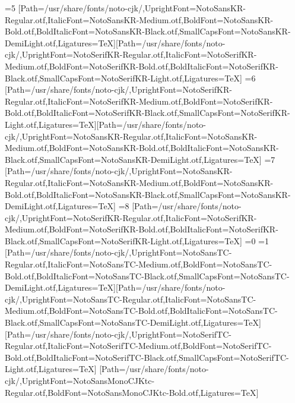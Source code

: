 \else\ifnum\value{CJKFonts}=5
[Path=/usr/share/fonts/noto-cjk/,UprightFont=NotoSansKR-Regular.otf,ItalicFont=NotoSansKR-Medium.otf,BoldFont=NotoSansKR-Bold.otf,BoldItalicFont=NotoSansKR-Black.otf,SmallCapsFont=NotoSansKR-DemiLight.otf,Ligatures=TeX][Path=/usr/share/fonts/noto-cjk/,UprightFont=NotoSerifKR-Regular.otf,ItalicFont=NotoSerifKR-Medium.otf,BoldFont=NotoSerifKR-Bold.otf,BoldItalicFont=NotoSerifKR-Black.otf,SmallCapsFont=NotoSerifKR-Light.otf,Ligatures=TeX]
\else\ifnum\value{CJKFonts}=6
[Path=/usr/share/fonts/noto-cjk/,UprightFont=NotoSerifKR-Regular.otf,ItalicFont=NotoSerifKR-Medium.otf,BoldFont=NotoSerifKR-Bold.otf,BoldItalicFont=NotoSerifKR-Black.otf,SmallCapsFont=NotoSerifKR-Light.otf,Ligatures=TeX][Path=/usr/share/fonts/noto-cjk/,UprightFont=NotoSansKR-Regular.otf,ItalicFont=NotoSansKR-Medium.otf,BoldFont=NotoSansKR-Bold.otf,BoldItalicFont=NotoSansKR-Black.otf,SmallCapsFont=NotoSansKR-DemiLight.otf,Ligatures=TeX]
\else\ifnum\value{CJKFonts}=7
[Path=/usr/share/fonts/noto-cjk/,UprightFont=NotoSansKR-Regular.otf,ItalicFont=NotoSansKR-Medium.otf,BoldFont=NotoSansKR-Bold.otf,BoldItalicFont=NotoSansKR-Black.otf,SmallCapsFont=NotoSansKR-DemiLight.otf,Ligatures=TeX]
\else\ifnum\value{CJKFonts}=8
[Path=/usr/share/fonts/noto-cjk/,UprightFont=NotoSerifKR-Regular.otf,ItalicFont=NotoSerifKR-Medium.otf,BoldFont=NotoSerifKR-Bold.otf,BoldItalicFont=NotoSerifKR-Black.otf,SmallCapsFont=NotoSerifKR-Light.otf,Ligatures=TeX]
\fi\fi\fi\fi\fi\fi\fi\fi
\fi\fi\fi\fi\fi\fi
\ifnum\value{NotoCJKFamily}=0
\else\ifnum\value{NotoCJKFamily}=1
\newfontfamily{}[Path=/usr/share/fonts/noto-cjk/,UprightFont=NotoSansTC-Regular.otf,ItalicFont=NotoSansTC-Medium.otf,BoldFont=NotoSansTC-Bold.otf,BoldItalicFont=NotoSansTC-Black.otf,SmallCapsFont=NotoSansTC-DemiLight.otf,Ligatures=TeX]\newfontfamily{}[Path=/usr/share/fonts/noto-cjk/,UprightFont=NotoSansTC-Regular.otf,ItalicFont=NotoSansTC-Medium.otf,BoldFont=NotoSansTC-Bold.otf,BoldItalicFont=NotoSansTC-Black.otf,SmallCapsFont=NotoSansTC-DemiLight.otf,Ligatures=TeX]
\newfontfamily{}[Path=/usr/share/fonts/noto-cjk/,UprightFont=NotoSerifTC-Regular.otf,ItalicFont=NotoSerifTC-Medium.otf,BoldFont=NotoSerifTC-Bold.otf,BoldItalicFont=NotoSerifTC-Black.otf,SmallCapsFont=NotoSerifTC-Light.otf,Ligatures=TeX]
\newfontfamily{}[Path=/usr/share/fonts/noto-cjk/,UprightFont=NotoSansMonoCJKtc-Regular.otf,BoldFont=NotoSansMonoCJKtc-Bold.otf,Ligatures=TeX]
